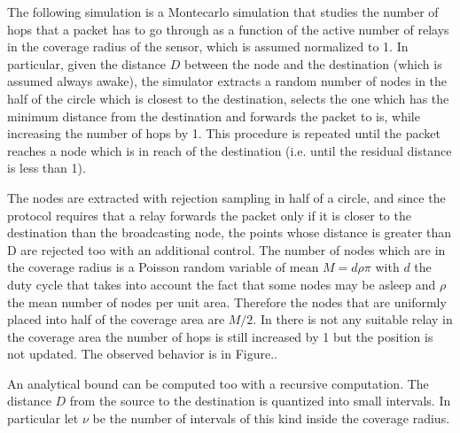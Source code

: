 \documentclass[10pt]{article}
\begin{document}
The following simulation is a Montecarlo simulation that studies the number of hops that a packet has to go through as a function of the active number of relays in the coverage radius of the sensor, which is assumed normalized to 1. In particular, given the distance $D$ between the node and the destination (which is assumed always awake), the simulator extracts a random number of nodes in the half of the circle which is closest to the destination, selects the one which has the minimum distance from the destination and forwards the packet to is, while increasing the number of hops by 1. This procedure is repeated until the packet reaches a node which is in reach of the destination (i.e. until the residual distance is less than 1). 

The nodes are extracted with rejection sampling in half of a circle, and since the protocol requires that a relay forwards the packet only if it is closer to the destination than the broadcasting node, the points whose distance is greater than D are rejected too with an additional control. The number of nodes which are in the coverage radius is a Poisson random variable of mean $M = d \rho \pi$ with $d$ the duty cycle that takes into account the fact that some nodes may be asleep and $\rho$ the mean number of nodes per unit area. Therefore the nodes that are uniformly placed into half of the coverage area are $M/2$. In there is not any suitable relay in the coverage area the number of hops is still increased by 1 but the position is not updated. The observed behavior is in Figure..

An analytical bound can be computed too with a recursive computation. The distance $D$ from the source to the destination is quantized into small intervals. In particular let $\nu$ be the number of intervals of this kind inside the coverage radius. 
\end{document}
